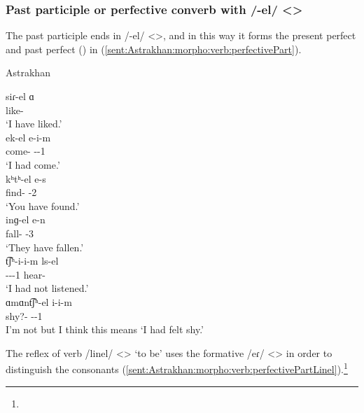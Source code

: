 \subsubsection{Past participle or perfective converb with /-el/ <>}

The past participle ends in /-el/ <>, and in this way it forms the present perfect and past perfect () in (\ref{sent:Astrakhan:morpho:verb:perfectivePart}).


\begin{exe}
	\ex Astrakhan \label{sent:Astrakhan:morpho:verb:perfectivePart}
	\begin{xlist}
		\ex \gll siɾ-el ɑ \\ 
		like-{\perfcvb} {\aux} \\
		\trans `I have liked.' \\ 
		\ex \gll ek-el e-i-m \\ 
		come-{\perfcvb} {\aux}-{\pst}-1{\sg} \\
		\trans `I had come.' \\ 
		\ex \gll kʰtʰ-el e-s\\ 
		find-{\perfcvb} {\aux}-2{\sg} \\
		\trans `You have found.' \\ 
		\ex \gll inɡ-el e-n\\ 
		fall-{\perfcvb} {\aux}-3{\pl} \\
		\trans `They have fallen.' \\ 
		\ex \gll t͡ʃʰ-i-i-m ls-el \\ 
		{\neggloss}-{\aux}-{\pst}-1{\sg} hear-{\perfcvb}\\
		\trans `I had not listened.' \\
		\ex \gll ɑmɑnt͡ʃʰ-el i-i-m \\ 
		shy?-{\perfcvb} {\aux}-{\pst}-1{\sg} \\
		\trans I'm not but I think this means `I had felt shy.' \\
	\end{xlist}
\end{exe}

The reflex of verb /linel/ <> `to be' uses the formative  /eɾ/ <> in order to distinguish the consonants (\ref{sent:Astrakhan:morpho:verb:perfectivePartLinel}).\footnote{}


